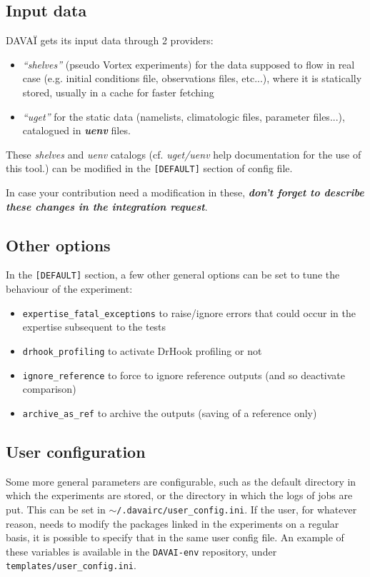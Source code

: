 \documentclass[a4paper,10pt,twoside]{article}
\begin{document}
\subsection{Input data}
DAVAÏ gets its input data through 2 providers:
\begin{itemize}
 \item \textit{``shelves''} (pseudo Vortex experiments) for the data supposed to flow in real case (e.g. initial conditions file, observations files, etc...), where it is statically stored, usually in a cache for faster fetching
 \item \textit{``uget''} for the static data (namelists, climatologic files, parameter files...), catalogued in \textit{\textbf{uenv}} files.
\end{itemize}

These \textit{shelves} and \textit{uenv} catalogs (cf. \textit{uget/uenv} help documentation for the use of this tool.) can be modified in the \texttt{[DEFAULT]} section of config file.

In case your contribution need a modification in these, \textbf{\textit{don't forget to describe these changes in the integration request}}.



\subsection{Other options}
In the \texttt{[DEFAULT]} section, a few other general options can be set to tune the behaviour of the experiment:
\begin{itemize}
 \item \texttt{expertise\_fatal\_exceptions} to raise/ignore errors that could occur in the expertise subsequent to the tests
 \item \texttt{drhook\_profiling} to activate DrHook profiling or not
 \item \texttt{ignore\_reference} to force to ignore reference outputs (and so deactivate comparison)
 \item \texttt{archive\_as\_ref} to archive the outputs (saving of a reference only)
\end{itemize}


\subsection{User configuration}
Some more general parameters are configurable, such as the default directory in which the experiments are stored, or the directory in which the logs of jobs are put. This can be set in \texttt{$\sim$/.davairc/user\_config.ini}.
If the user, for whatever reason, needs to modify the packages linked in the experiments on a regular basis, it is possible to specify that in the same user config file.
An example of these variables is available in the \texttt{DAVAI-env} repository, under \texttt{templates/user\_config.ini}.
\end{document}
